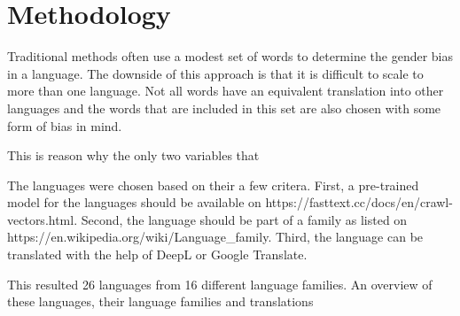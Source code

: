\section{Methodology}
Traditional methods often use a modest set of words to determine the 
gender bias in a language. The downside of this approach is that it is
difficult to scale to more than one language. Not all words have an
equivalent translation into other languages and the words that are
included in this set are also chosen with some form of bias in mind.

This is reason why the only two variables that

The languages were chosen based on their a few critera. First, a pre-trained 
model for the languages should be available on https://fasttext.cc/docs/en/crawl-vectors.html.
Second, the language should be part of a family as listed on https://en.wikipedia.org/wiki/Language_family.
Third, the language can be translated with the help of DeepL or Google Translate.

This resulted 26 languages from 16 different language families. An overview of these languages, their
language families and translations
